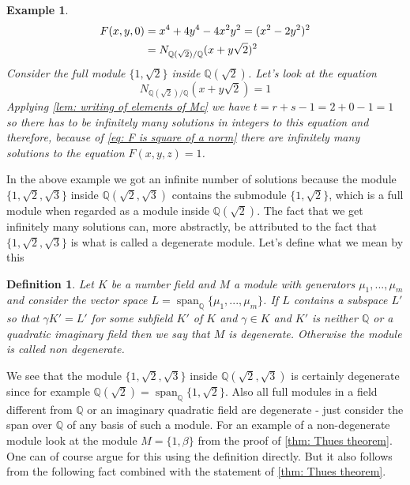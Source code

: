 \documentclass{article}
\newcommand{\Span}{\operatorname{span}}
\newtheorem{definition}{Definition}[section]
\newtheorem{example}{Example}[section]
\newcommand{\mbb}[1]{\mathbb{#1}}
\numberwithin{equation}{section}
\begin{document}
\begin{example}
    \begin{align}\label{eq: F is square of a norm}
        F(x,y,0) & = x^4 + 4y^4 - 4x^2y^2 = (x^2 - 2y^2)^2                \\
                 & = N_{\mbb Q(\sqrt 2) / \mbb Q}(x + y \sqrt 2)^2 \notag
    \end{align}
    Consider the full module $\{1, \sqrt 2\}$ inside $\mbb Q(\sqrt 2)$. Let's look at the equation
    $$N_{\mbb Q(\sqrt 2) / \mbb Q}(x + y \sqrt 2) = 1$$
    Applying \cref{lem: writing of elements of Mc} we have $t = r+s -1 =  2 + 0 - 1 = 1$ so there has to be infinitely many solutions in integers to this equation and therefore, because of \cref{eq: F is square of a norm} there are infinitely many solutions to the equation $F(x, y, z) = 1$.
\end{example}
In the above example we got an infinite number of solutions because the module $\{1, \sqrt 2, \sqrt 3 \}$ inside $\mbb Q(\sqrt 2, \sqrt 3)$ contains the submodule $\{1, \sqrt 2\}$, which is a full module when regarded as a module inside $\mbb Q(\sqrt 2)$. The fact that we get infinitely many solutions can, more abstractly, be attributed to the fact that $\{1, \sqrt 2, \sqrt 3 \}$ is what is called a degenerate module. Let's define what we mean by this
\begin{definition}\label{def: Degenerate module}
    Let $K$ be a number field and $M$ a module with generators $\mu_1, ..., \mu_m$ and consider the vector space $L = \Span_{\mbb Q}\{\mu_1, ..., \mu_m \}$. If $L$ contains a subspace $L'$ so that $\gamma K' = L'$ for some subfield $K'$ of $K$ and $\gamma \in K$ and $K'$ is neither $\mbb Q$ or a quadratic imaginary field then we say that $M$ is degenerate. Otherwise the module is called non degenerate.
\end{definition}
We see that the module $\{1, \sqrt 2, \sqrt 3 \}$ inside $\mbb Q(\sqrt 2, \sqrt 3)$ is certainly degenerate since for example $\mbb Q(\sqrt 2) = \Span_{\mbb Q} \{1, \sqrt 2 \}$. Also all full modules in a field different from $\mbb Q$ or an imaginary quadratic field are degenerate - just consider the span over $\mbb Q$ of any basis of such a module. For an example of a non-degenerate module look at the module $M = \{1, \beta \}$ from the proof of \cref{thm: Thues theorem}. One can of course argue for this using the definition directly. But it also follows from the following fact combined with the statement of \cref{thm: Thues theorem}.
\end{document}
